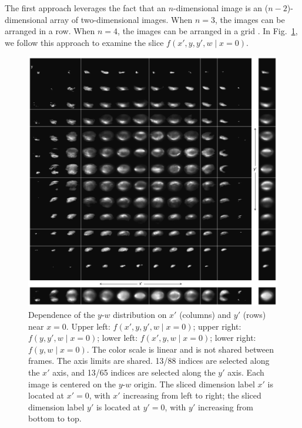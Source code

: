 \documentclass[%
 reprint,
nofootinbib,
 amsmath,amssymb,
 aps,
prstab,
]{revtex4-2}
\begin{document}
The first approach leverages the fact that an $n$-dimensional image is an ($n-2$)-dimensional array of two-dimensional images. When $n = 3$, the images can be arranged in a row. When $n = 4$, the images can be arranged in a grid \cite{Ruisard2020}. In Fig.~\ref{fig:matrix_slice_xpyp_view_yw}, we follow this approach to examine the slice $f(x', y, y', w \mid x{=}0)$.
%
\begin{figure}[]
    \centering
    \includegraphics[width=\textwidth]{fig_matrix_slice_x'-y'_view_w-y.pdf}
    \caption{Dependence of the $y$-$w$ distribution on $x'$ (columns) and $y'$ (rows) near $x = 0$. Upper left: $f(x', y, y', w \mid x{=}0)$; upper right: $f(y, y', w \mid x{=}0)$; lower left: $f(x', y, w \mid x{=}0)$; lower right: $f(y, w \mid x{=}0)$. The color scale is linear and is not shared between frames. The axis limits are shared. 13/88 indices are selected along the $x'$ axis, and 13/65 indices are selected along the $y'$ axis. Each image is centered on the $y$-$w$ origin. The sliced dimension label $x'$ is located at $x' = 0$, with $x'$ increasing from left to right; the sliced dimension label $y'$ is located at $y' = 0$, with $y'$ increasing from bottom to top.}
    \label{fig:matrix_slice_xpyp_view_yw}
\end{figure}
%
\end{document}

